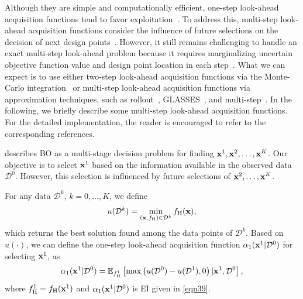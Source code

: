 \documentclass[journal ]{new-aiaa}
\begin{document}
Although they are simple and computationally efficient, one-step look-ahead acquisition functions tend to favor exploitation~\citep{Hennig2022}.
To address this, multi-step look-ahead acquisition functions consider the influence of future selections on the decision of next design points~\citep[see e.g.,][]{Streltsov1999,Ginsbourger2010}.
However, it still remains challenging to handle an exact multi-step look-ahead problem because it requires marginalizing uncertain objective function value and design point location in each step~\citep{Gonzalez2016}.
What we can expect is to use either
two-step look-ahead acquisition functions via the Monte-Carlo integration~\citep{WuJ2019} or multi-step look-ahead acquisition functions via approximation techniques, such as rollout~\citep{Lam2016,Lee2020}, GLASSES~\citep{Gonzalez2016}, and multi-step~\citep{Jiang2020}.
In the following, we briefly describe some multi-step look-ahead acquisition functions.
For the detailed implementation, the reader is encouraged to refer to the corresponding references.

 describes BO as a multi-stage decision problem for finding ${\bf x}^1,{\bf x}^2,\dots,{\bf x}^{K}$.
Our objective is to select ${\bf x}^1$ based on the information available in the observed data $\mathcal{D}^0$.
However, this selection is influenced by future selections of ${\bf x}^2,\dots,{\bf x}^{K}$.

For any data $\mathcal{D}^k$, $k=0,\dots,K$, we define
\begin{equation}\label{eqn49}
	u(\mathcal{D}^k) = \underset{({\bf x},f_{\text{H}}) \in \mathcal{D}^k}{\min}\,f_{\text{H}}({\bf x}),
\end{equation} 
which returns the best solution found among the data points of $\mathcal{D}^k$.
Based on $u(\cdot)$, we can define the one-step look-ahead acquisition function $\alpha_1({\bf x}^1|\mathcal{D}^{0})$ for selecting ${\bf x}^1$, as
\begin{equation}\label{eqn50}
	\alpha_1({\bf x}^1|\mathcal{D}^0)
	=\mathbb{E}_{f^1_\text{H}}\left[\max\left(u(\mathcal{D}^0) - u(\mathcal{D}^1),0\right)
	|{\bf x}^1,\mathcal{D}^0\right],
\end{equation} 
where $f^1_\text{H} = f_\text{H}({\bf x}^1)$ and $\alpha_1({\bf x}^1|\mathcal{D}^{0})$ is EI given in \cref{eqn39}.
\end{document}
